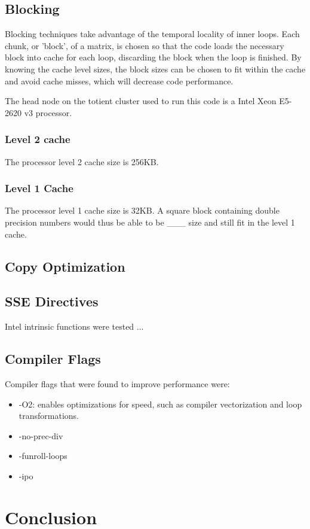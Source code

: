 \documentclass{article}	 %
\begin{document}
\subsection{Blocking}
Blocking techniques take advantage of the temporal locality of inner loops. Each chunk, or 'block', of a matrix, is chosen so that the code loads the necessary block into cache for each loop, discarding the block when the loop is finished. By knowing the cache level sizes, the block sizes can be chosen to fit within the cache and avoid cache misses, which will decrease code performance. 

The head node on the totient cluster used to run this code is a Intel Xeon E5-2620 v3 processor. 

\subsubsection{Level 2 cache}
The processor level 2 cache size is 256KB. 

\subsubsection{Level 1 Cache}
The processor level 1 cache size is 32KB. A square block containing double precision numbers would thus be able to be ___ size and still fit in the level 1 cache. 


\subsection{Copy Optimization}
\subsection{SSE Directives}

Intel intrinsic functions were tested ...

\subsection{Compiler Flags}
Compiler flags that were found to improve performance were: \\
\begin{itemize}
\item -O2: enables optimizations for speed, such as compiler vectorization and loop transformations.
\item -no-prec-div
\item -funroll-loops
\item -ipo

\end{itemize}

\section{Conclusion}

\end{document}
